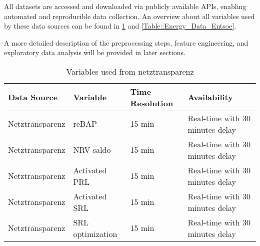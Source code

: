 \documentclass[class=scrbook, crop=false]{standalone}
\begin{document}
All datasets are accessed and downloaded via publicly available APIs, enabling automated and reproducible data collection.
An overview about all variables used by these data sources can be found in \ref{Table::Energy_Data_Netztransparenz} and \ref{Table::Energy_Data_Entsoe}.

A more detailed description of the preprocessing steps, feature engineering, and exploratory data analysis will be provided in later sections.

\begin{table}[]
\centering
\begin{tabular}{l|l|l|l}
 Data Source & Variable &  Time Resolution & Availability  \\\hline
 Netztransparenz & reBAP & 15 min & Real-time with 30 minutes delay \\
 Netztransparenz & NRV-saldo & 15 min & Real-time with 30 minutes delay \\
 Netztransparenz & Activated PRL & 15 min & Real-time with 30 minutes delay \\
 Netztransparenz & Activated SRL & 15 min & Real-time with 30 minutes delay \\
 Netztransparenz & SRL optimization & 15 min & Real-time with 30 minutes delay \\
 
\end{tabular}
\caption{Variables used from netztransparenz}
\label{Table::Energy_Data_Netztransparenz}
\end{table}
\end{document}
